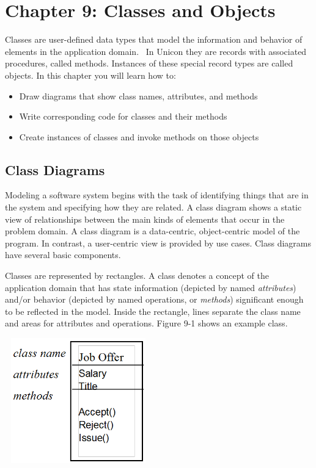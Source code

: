 \clearpage\section{Chapter 9: Classes and Objects}
Classes are user-defined data types that model the information and
behavior of elements in the application domain. \ In Unicon they are
records with associated procedures, called methods. Instances of these
special record types are called objects. In this chapter you will learn
how to:

\begin{itemize}
\item Draw diagrams that show class names, attributes, and methods
\item Write corresponding code for classes and their methods
\item Create instances of classes and invoke methods on those objects
\end{itemize}
\subsection{Class Diagrams}
Modeling a software system begins with the task of identifying things
that are in the system and specifying how they are related. A class
diagram shows a static view of relationships between the main kinds of
elements that occur in the problem domain. A class diagram is a
data-centric, object-centric model of the program. In contrast, a
user-centric view is provided by use cases. Class
diagrams have several basic components.

Classes are represented by rectangles. A
{\textquotedbl}class{\textquotedbl} denotes a concept of the
application domain that has state information (depicted by named
\textit{attributes}) and/or behavior (depicted
by named operations, or \textit{methods}) significant
enough to be reflected in the model. Inside the rectangle, lines
separate the class name and areas for attributes and operations. Figure
9-1 shows an example class.

\bigskip

\includegraphics[width=2.5in,height=2.1335in]{ub-img/umlclass.png} 

